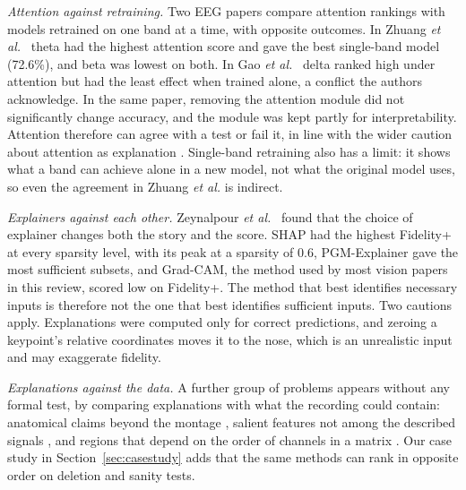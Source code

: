\textit{Attention against retraining.} Two EEG papers compare attention rankings with models retrained on one band at a time, with opposite outcomes. In Zhuang \textit{et al.}~\cite{zhuang2024connectivity} theta had the highest attention score and gave the best single-band model (72.6\%), and beta was lowest on both. In Gao \textit{et al.}~\cite{gao2024sftnet} delta ranked high under attention but had the least effect when trained alone, a conflict the authors acknowledge. In the same paper, removing the attention module did not significantly change accuracy, and the module was kept partly for interpretability. Attention therefore can agree with a test or fail it, in line with the wider caution about attention as explanation \cite{jain2019attention}. Single-band retraining also has a limit: it shows what a band can achieve alone in a new model, not what the original model uses, so even the agreement in Zhuang \textit{et al.} is indirect.

\textit{Explainers against each other.} Zeynalpour \textit{et al.}~\cite{zeynalpour2025multimethod} found that the choice of explainer changes both the story and the score. SHAP had the highest Fidelity+ at every sparsity level, with its peak at a sparsity of 0.6, PGM-Explainer gave the most sufficient subsets, and Grad-CAM, the method used by most vision papers in this review, scored low on Fidelity+. The method that best identifies necessary inputs is therefore not the one that best identifies sufficient inputs. Two cautions apply. Explanations were computed only for correct predictions, and zeroing a keypoint's relative coordinates moves it to the nose, which is an unrealistic input and may exaggerate fidelity.

\textit{Explanations against the data.} A further group of problems appears without any formal test, by comparing explanations with what the recording could contain: anatomical claims beyond the montage \cite{xu2026dynamic}, salient features not among the described signals \cite{theivadas2025dynamic}, and regions that depend on the order of channels in a matrix \cite{wu2024driver}. Our case study in Section~\ref{sec:casestudy} adds that the same methods can rank in opposite order on deletion and sanity tests.

